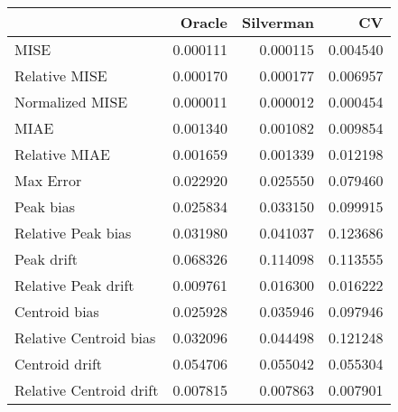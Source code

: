 \begin{tabular}{lrrr}
  \hline
 & Oracle & Silverman & CV \\ 
  \hline
MISE & 0.000111 & 0.000115 & 0.004540 \\ 
  Relative MISE & 0.000170 & 0.000177 & 0.006957 \\ 
  Normalized MISE & 0.000011 & 0.000012 & 0.000454 \\ 
  MIAE & 0.001340 & 0.001082 & 0.009854 \\ 
  Relative MIAE & 0.001659 & 0.001339 & 0.012198 \\ 
  Max Error & 0.022920 & 0.025550 & 0.079460 \\ 
  Peak bias & 0.025834 & 0.033150 & 0.099915 \\ 
  Relative Peak bias & 0.031980 & 0.041037 & 0.123686 \\ 
  Peak drift & 0.068326 & 0.114098 & 0.113555 \\ 
  Relative Peak drift & 0.009761 & 0.016300 & 0.016222 \\ 
  Centroid bias & 0.025928 & 0.035946 & 0.097946 \\ 
  Relative Centroid bias & 0.032096 & 0.044498 & 0.121248 \\ 
  Centroid drift & 0.054706 & 0.055042 & 0.055304 \\ 
  Relative Centroid drift & 0.007815 & 0.007863 & 0.007901 \\ 
   \hline
\end{tabular}
